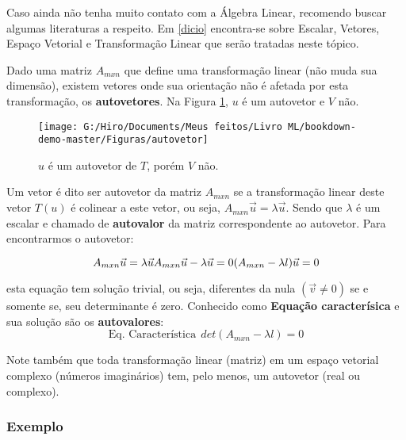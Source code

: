 \documentclass[
]{book}
\begin{document}
Caso ainda não tenha muito contato com a Álgebra Linear, recomendo buscar algumas literaturas a respeito. Em \ref{dicio} encontra-se sobre Escalar, Vetores, Espaço Vetorial e Transformação Linear que serão tratadas neste tópico.

Dado uma matriz \(A_{mxn}\) que define uma transformação linear (não muda sua dimensão), existem vetores onde sua orientação não é afetada por esta transformação, os \textbf{autovetores}. Na Figura \ref{fig:autovetor}, \(u\) é um autovetor e \(V\) não.

\begin{figure}

{\centering \texttt{[image: G:/Hiro/Documents/Meus feitos/Livro ML/bookdown-demo-master/Figuras/autovetor]} 

}

\caption{\(u\) é um autovetor de \(T\), porém \(V\) não.}\label{fig:autovetor}
\end{figure}



Um vetor é dito ser autovetor da matriz \(A_{mxn}\) se a transformação linear deste vetor \(T(u)\) é colinear a este vetor, ou seja, \(A_{mxn}\vec{u}=\lambda \vec{u}\). Sendo que \(\lambda\) é um escalar e chamado de \textbf{autovalor} da matriz correspondente ao autovetor. Para encontrarmos o autovetor:

\begin{equation}
    A_{mxn}\vec{u}=\lambda \vec{u} \\
A_{mxn}\vec{u}-\lambda \vec{u}=0 \\
(A_{mxn}-\lambda l)\vec{u}=0
    \label{eq:autovetor}
\end{equation}

esta equação tem solução trivial, ou seja, diferentes da nula \((\vec{v}\neq 0 )\) se e somente se, seu determinante é zero. Conhecido como \textbf{Equação caracterísica} e sua solução são os \textbf{autovalores}:
\begin{equation}
    \mbox{Eq. Característica}\ \  det(A_{mxn}-\lambda l)=0  
    \label{eq:eqcarac}
\end{equation}

Note também que toda transformação linear (matriz) em um espaço
vetorial complexo (números imaginários) tem, pelo menos, um autovetor (real ou complexo).

\hypertarget{exautovetor1}{%
\subsubsection{Exemplo}\label{exautovetor1}}
\end{document}
